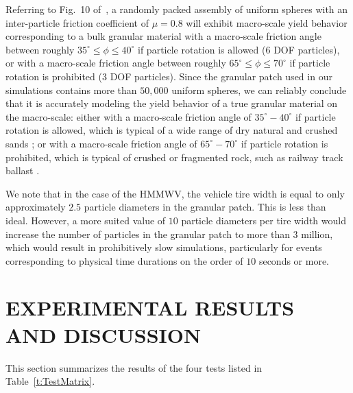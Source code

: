 \documentclass[12pt,onecolumn]{article}
\begin{document}
Referring to Fig.~10 of~\cite{fleischmannetalGEGE2014}, a randomly packed assembly of uniform spheres with an inter-particle friction coefficient of $\mu = 0.8$ will exhibit macro-scale yield behavior corresponding to a bulk granular material with a macro-scale friction angle between roughly $35^\circ \leq \phi \leq 40^\circ$ if particle rotation is allowed (6 DOF particles), or with a macro-scale friction angle between roughly $65^\circ \leq \phi \leq 70^\circ$ if particle rotation is prohibited (3 DOF particles).
%
Since the granular patch used in our simulations contains more than $50,000$ uniform spheres, we can reliably conclude that it is accurately modeling the yield behavior of a true granular material on the macro-scale: either with a macro-scale friction angle of $35^\circ-40^\circ$ if particle rotation is allowed, which is typical of a wide range of dry natural and crushed sands \cite{Cho&Dodds&Santamarina2006}; or with a macro-scale friction angle of $65^\circ-70^\circ$ if particle rotation is prohibited, which is typical of crushed or fragmented rock, such as railway track ballast \cite{Indraratnaetal1998}.

We note that in the case of the HMMWV, the vehicle tire width is equal to only approximately $2.5$ particle diameters in the granular patch.  This is less than ideal.  However, a more suited value of $10$ particle diameters per tire width would increase the number of particles in the granular patch to more than $3$ million, which would result in prohibitively slow simulations, particularly for events corresponding to physical time durations on the order of $10$ seconds or more.




\section{EXPERIMENTAL RESULTS AND DISCUSSION}\label{s:results}

This section summarizes the results of the four tests listed in Table~\ref{t:TestMatrix}. 
\end{document}
